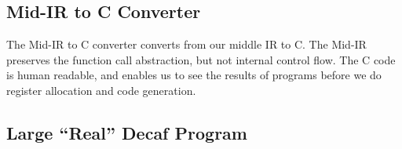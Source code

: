 \documentclass[11pt]{article}
\begin{document}
\subsection {Mid-IR to C Converter} 

The Mid-IR to C converter converts from our middle IR to C. The Mid-IR
preserves the function call abstraction, but not internal control
flow. The C code is human readable, and enables us to see the results
of programs before we do register allocation and code generation.

\subsection {Large ``Real'' Decaf Program}
\end{document}

